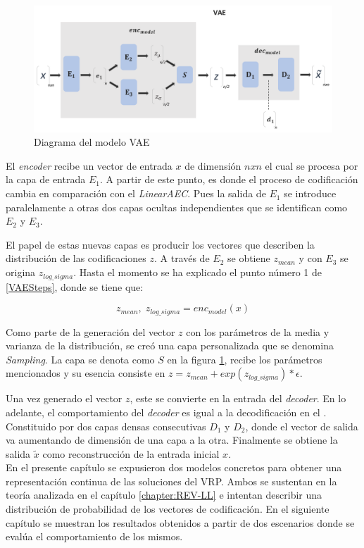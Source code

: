 \begin{figure}[!h]
	\centering
	\includegraphics[width=5in]{Graphics/vaemodel.png}
	
	\caption{ \small{Diagrama del modelo VAE}}
	
	\label{VAEmodel}
\end{figure}  

El \textit{encoder} recibe un vector de entrada $x$ de dimensión $nxn$ el cual se procesa por la  capa de entrada $E_1$. A partir de este punto, es donde el proceso de codificación cambia en comparación con el \textit{LinearAEC}. Pues la salida de $E_1$ se introduce paralelamente a otras dos capas ocultas independientes que se identifican como $E_2$ y $E_3$.

El papel de estas nuevas capas es producir los vectores que describen la distribución de las codificaciones $z$. A través de $E_2$ se obtiene $z_{mean}$ y con $E_3$ se origina $z_{log {\_} sigma}$. Hasta el momento se ha explicado el punto número 1 de \ref{VAESteps}, donde se tiene que:

\begin{equation}
	z_{mean} , \; z_{log\_sigma} = enc_{model}(x)
\end{equation} 

Como parte de la generación del vector $z$ con los parámetros de la media y varianza de la distribución, se creó una capa personalizada que se denomina \textit{Sampling}. La capa se denota como $S$ en la figura \ref{VAEmodel}, recibe los parámetros mencionados y su esencia consiste en $	z = z_{mean} + exp(z_{log{\_}sigma})*\epsilon$. 

Una vez generado el vector $z$, este se convierte en la entrada del \textit{decoder}. En lo adelante, el comportamiento del \textit{decoder} es igual a la decodificación en el . Constituido por dos capas densas consecutivas $D_1$ y $D_2$, donde el vector de salida va aumentando de dimensión de una capa a la otra. Finalmente se obtiene la salida $\tilde{x}$ como reconstrucción de la entrada inicial $x$.\\

En el presente capítulo se expusieron dos modelos concretos para obtener una representación continua de las soluciones del VRP. Ambos se sustentan en la teoría analizada en el capítulo \ref{chapter:REV-LL} e intentan describir una distribución de probabilidad de los vectores de codificación. En el siguiente capítulo se muestran los resultados obtenidos a partir de dos escenarios donde se evalúa el comportamiento de los mismos.



 



